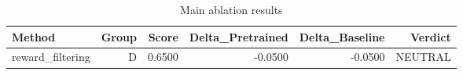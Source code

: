 \begin{table}[htbp]
\centering
\caption{Main ablation results}
\label{tab:main-results}
\begin{tabular}{lrrrrr}
\toprule
\textbf{Method} & \textbf{Group} & \textbf{Score} & \textbf{Delta\_Pretrained} & \textbf{Delta\_Baseline} & \textbf{Verdict} \\
\midrule
reward\_filtering & D & 0.6500 & -0.0500 & -0.0500 & NEUTRAL \\
\bottomrule
\end{tabular}
\end{table}
